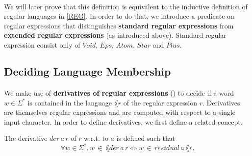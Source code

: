 

    \paragraph{}
    We will later prove that this definition is equivalent to the inductive definition of regular languages in \ref{REG}.
    In order to do that, we introduce a predicate on regular expressions that distinguishes \textbf{standard regular expressions} 
    from \textbf{extended regular expressions} (as introduced above).
    Standard regular expression consist only of $Void$, $Eps$, $Atom$, $Star$ and $Plus$.




    \subsection{Deciding Language Membership}
    \paragraph{}
    We make use of \textbf{derivatives of regular expressions} (\cite{DBLP:journals/jacm/Brzozowski64}) to decide if a word $w \in \Sigma^*$ is contained in the language $\lang{r}$ of the regular expression $r$. 
    Derivatives are themselves regular expressions and are computed with respect to a single input character. 
    In order to define derivatives, we first define a related concept.


    \begin{definition}{}
        \label{derivative}
        The derivative $der \,  a \, r$ of $r$ w.r.t. to $a$ is defined such that 
        \begin{equation*}       \forall w \in \Sigma^*. \, w \, \in \, \lang{der \, a \, r} \Leftrightarrow w \, \in \, residual \, a \, \lang{r}. \end{equation*}
        \end{definition}

